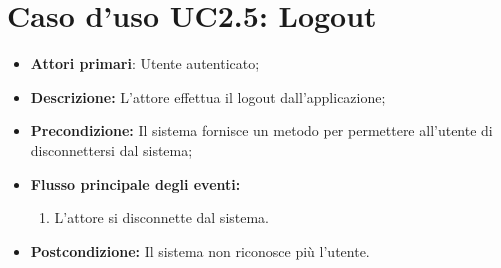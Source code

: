 		\section{Caso d'uso UC2.5: Logout }
		\begin{itemize}
			\item \textbf{Attori primari}: Utente autenticato;
			\item \textbf{Descrizione:} L'attore effettua il logout dall'applicazione;
			\item \textbf{Precondizione:} Il sistema fornisce un metodo per permettere all'utente di disconnettersi dal sistema;
			\item \textbf{Flusso principale degli eventi:}
			\begin{enumerate}
				\item L'attore si disconnette dal sistema.
			\end{enumerate}
			\item \textbf{Postcondizione:} Il sistema non riconosce più l'utente.
		\end{itemize}
			